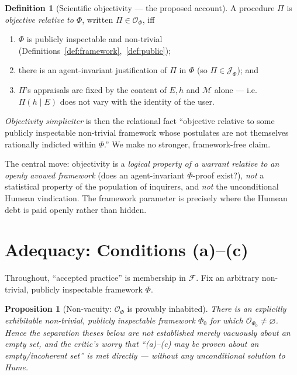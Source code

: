 \documentclass{amsart}
\theoremstyle{definition}
\newtheorem{definition}{Definition}
\theoremstyle{plain}
\newtheorem{proposition}{Proposition}
\theoremstyle{remark}
\begin{document}
\begin{definition}[Scientific objectivity --- the proposed account]
\label{def:objectivity}
A procedure $\Pi$ is \emph{objective relative to $\Phi$}, written
$\Pi\in\mathcal{O}_\Phi$, iff
\begin{enumerate}
\item[(O1)] $\Phi$ is publicly inspectable and non-trivial
(Definitions~\ref{def:framework},~\ref{def:public});
\item[(O2)] there is an agent-invariant justification of $\Pi$ in $\Phi$
(so $\Pi\in\mathcal{J}_\Phi$); and
\item[(O3)] $\Pi$'s appraisals are fixed by the content of $E,h$ and
$\mathcal{M}$ alone --- i.e.\ $\Pi(h\mid E)$ does not vary with the identity of
the user.
\end{enumerate}
\emph{Objectivity simpliciter} is then the relational fact ``objective relative
to some publicly inspectable non-trivial framework whose postulates are not
themselves rationally indicted within $\Phi$.'' We make no stronger,
framework-free claim.
\end{definition}

The central move: objectivity is a \emph{logical property of a warrant relative
to an openly avowed framework} (does an agent-invariant $\Phi$-proof exist?),
\emph{not} a statistical property of the population of inquirers, and \emph{not}
the unconditional Humean vindication. The framework parameter is precisely
where the Humean debt is paid openly rather than hidden.

\section{Adequacy: Conditions (a)--(c)}

Throughout, ``accepted practice'' is membership in $\mathcal{F}$. Fix an
arbitrary non-trivial, publicly inspectable framework $\Phi$.

\begin{proposition}[Non-vacuity: $\mathcal{O}_\Phi$ is provably inhabited]
\label{prop:nonempty}
There is an explicitly exhibitable non-trivial, publicly inspectable framework
$\Phi_0$ for which $\mathcal{O}_{\Phi_0}\neq\varnothing$. Hence the separation
theses below are not established merely \emph{vacuously} about an empty set, and
the critic's worry that ``(a)--(c) may be proven about an empty/incoherent set''
is met directly --- \emph{without} any unconditional solution to Hume.
\end{proposition}
\end{document}
